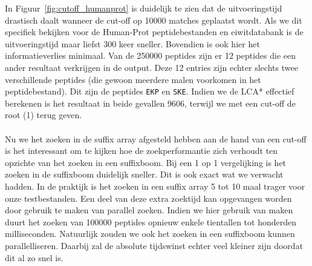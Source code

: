 In Figuur~\ref{fig:cutoff_humanprot} is duidelijk te zien dat de uitvoeringstijd drastisch daalt wanneer de cut-off op 10000 matches geplaatst wordt.
Als we dit specifiek bekijken voor de Human-Prot peptidebestanden en eiwitdatabank is de uitvoeringstijd maar liefst 300 keer sneller.
Bovendien is ook hier het informatieverlies minimaal.
Van de 250000 peptides zijn er 12 peptides die een ander resultaat verkrijgen in de output.
Deze 12 entries zijn echter slechts twee verschillende peptides (die gewoon meerdere malen voorkomen in het peptidebestand).
Dit zijn de peptides \texttt{EKP} en \texttt{SKE}.
Indien we de LCA* effectief berekenen is het resultaat in beide gevallen 9606, terwijl we met een cut-off de root (1) terug geven.
\\ \\
Nu we het zoeken in de suffix array afgesteld hebben aan de hand van een cut-off is het interessant om te kijken hoe de zoekperformantie zich verhoudt ten opzichte van het zoeken in een suffixboom.
Bij een 1 op 1 vergelijking is het zoeken in de suffixboom duidelijk sneller.
Dit is ook exact wat we verwacht hadden.
In de praktijk is het zoeken in een suffix array 5 tot 10 maal trager voor onze testbestanden.
Een deel van deze extra zoektijd kan opgevangen worden door gebruik te maken van parallel zoeken.
Indien we hier gebruik van maken duurt het zoeken van 100000 peptides opnieuw enkele tientallen tot honderden milliseconden.
Natuurlijk zouden we ook het zoeken in een suffixboom kunnen parallelliseren.
Daarbij zal de absolute tijdswinst echter veel kleiner zijn doordat dit al zo snel is.

